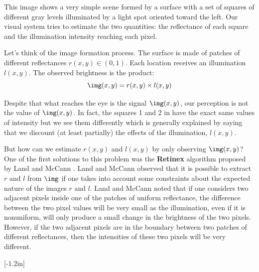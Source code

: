 This image shows a very simple scene formed by a surface with a set of squares of different gray levels illuminated by a light spot oriented toward the left. Our visual system tries to estimate the two quantities: the reflectance of each square and the illumination intensity reaching each pixel.

Let's think of the image formation process. The surface is made of patches of different reflectances $r(x,y) \in (0,1)$. Each location receives an illumination $l(x,y)$. The observed brightness is the product:
\begin{equation}
	\img (x,y) = r(x,y) \times l(x,y)
\end{equation}

Despite that what reaches the eye is the signal $\img(x,y)$, our perception is not the value of $\img(x,y)$. In fact, the squares 1 and 2 in \fig{\ref{fig:simultaneous}} have the exact same values of intensity but we see them differently which is generally explained by saying that we discount (at least partially) the effects of the illumination, $l(x,y)$.

But how can we estimate $r(x,y)$ and $l(x,y)$ by only observing $\img(x,y)$? One of the first solutions to this problem was the {\bf Retinex} algorithm proposed by Land and McCann \cite{Land1971}. Land and McCann observed that it is possible to extract $r$ and $l$ from $\img$ if one takes into account some constraints about the expected nature of the images $r$ and $l$. Land and McCann noted that if one considers two adjacent pixels inside one of the patches of uniform reflectance, the difference between the two pixel values will be very small as the illumination, even if it is nonuniform, will only produce a small change in the brightness of the two pixels. However, if the two adjacent pixels are in the boundary between two patches of different reflectances, then the intensities of these two pixels will be very different.

[-1.2in]

